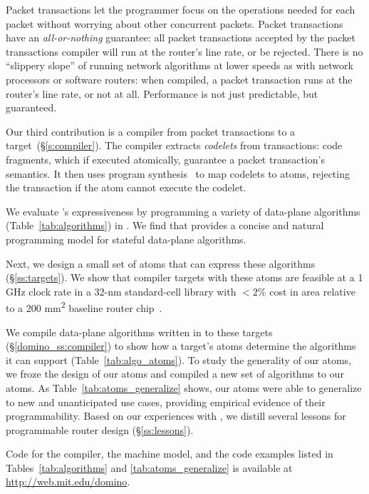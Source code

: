Packet transactions let the programmer focus on the operations needed for each
packet without worrying about other concurrent packets. Packet transactions
have an \textit{all-or-nothing} guarantee: all packet transactions accepted by
the packet transactions compiler will run at the router's line rate, or be
rejected.  There is no ``slippery slope'' of running network algorithms at
lower speeds as with network processors or software routers: when compiled, a
packet transaction runs at the router's line rate, or not at all.  Performance
is not just predictable, but guaranteed.

Our third contribution is a compiler from \pktlanguage packet transactions to a
\absmachine target~(\S\ref{s:compiler}). The \pktlanguage compiler extracts
{\em codelets} from  transactions: code fragments, which if executed
atomically, guarantee a packet transaction's semantics. It then uses program
synthesis~\cite{sketch_asplos} to map codelets to atoms, rejecting the
transaction if the atom cannot execute the codelet.

We evaluate \pktlanguage's expressiveness by programming a variety of
data-plane algorithms (Table~\ref{tab:algorithms}) in \pktlanguage. We find
that \pktlanguage provides a concise and natural programming model for stateful
data-plane algorithms.

Next, we design a small set of atoms that can
express these algorithms (\S\ref{ss:targets}).  We show that compiler targets
with these atoms are feasible at a 1 GHz clock rate in a 32-nm standard-cell
library with $< 2\%$ cost in area relative to a 200 \si{\milli\metre\squared}
baseline router chip~\cite{gibb_parsing}.

We compile data-plane algorithms written in \pktlanguage to these targets
(\S\ref{domino_ss:compiler}) to show how a target's atoms determine the
algorithms it can support (Table~\ref{tab:algo_atoms}). To study the generality
of our atoms, we froze the design of our atoms and compiled a new set of
\pktlanguage algorithms to our atoms. As Table~\ref{tab:atoms_generalize}
shows, our atoms were able to generalize to new and unanticipated use cases,
providing empirical evidence of their programmability. Based on our experiences
with \pktlanguage, we distill several lessons for programmable router design
(\S\ref{ss:lessons}).

Code for the \pktlanguage compiler, the \absmachine machine model, and the code
examples listed in Tables~\ref{tab:algorithms} and \ref{tab:atoms_generalize} is available at
\url{http://web.mit.edu/domino}.
